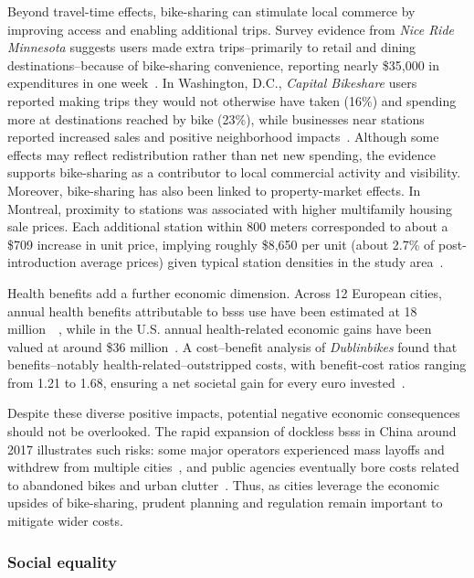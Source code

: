 Beyond travel-time effects, bike-sharing can stimulate local commerce by improving access and enabling additional trips. Survey evidence from \textit{Nice Ride Minnesota} suggests users made extra trips--primarily to retail and dining destinations--because of bike-sharing convenience, reporting nearly \$35,000 in expenditures in one week~\cite{Schoner2012}. In Washington, D.C., \textit{Capital Bikeshare} users reported making trips they would not otherwise have taken (16\%) and spending more at destinations reached by bike (23\%), while businesses near stations reported increased sales and positive neighborhood impacts~\cite{Buehler2014}. Although some effects may reflect redistribution rather than net new spending, the evidence supports bike-sharing as a contributor to local commercial activity and visibility. Moreover, bike-sharing has also been linked to property-market effects. In Montreal, proximity to stations was associated with higher multifamily housing sale prices. Each additional station within 800 meters corresponded to about a \$709 increase in unit price, implying roughly \$8,650 per unit (about 2.7\% of post-introduction average prices) given typical station densities in the study area~\cite{ElGeneidy2016}.

Health benefits add a further economic dimension. Across 12 European cities, annual health benefits attributable to \acp{bss} use have been estimated at 18 million~\texteuro{}~\cite{Otero2018}, while in the U.S. annual health-related economic gains have been valued at around \$36 million~\cite{Clockston2021}. A cost--benefit analysis of \textit{Dublinbikes} found that benefits--notably health-related--outstripped costs, with benefit-cost ratios ranging from 1.21 to 1.68, ensuring a net societal gain for every euro invested~\cite{Murphy2015}.

Despite these diverse positive impacts, potential negative economic consequences should not be overlooked. The rapid expansion of dockless \acp{bss} in China around 2017 illustrates such risks: some major operators experienced mass layoffs and withdrew from multiple cities~\cite{Fortune2017, BusinessInsider2018}, and public agencies eventually bore costs related to abandoned bikes and urban clutter~\cite{Chen2019}. Thus, as cities leverage the economic upsides of bike-sharing, prudent planning and regulation remain important to mitigate wider costs.

\subsubsection{Social equality}

